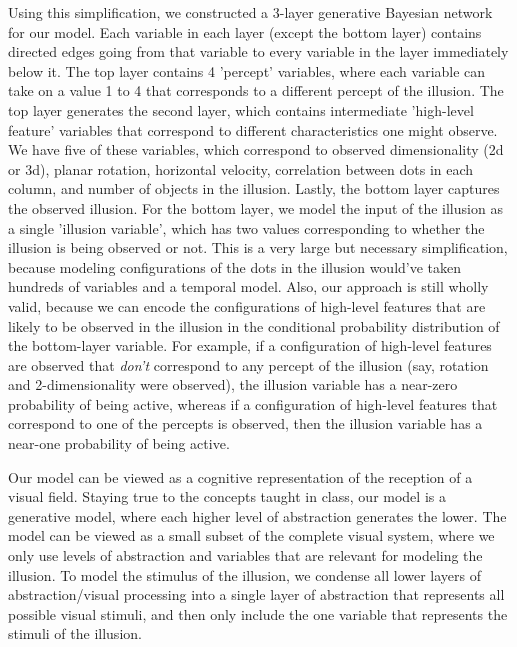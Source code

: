 \documentclass{article} %
\begin{document}
Using this simplification, we constructed a 3-layer generative Bayesian network for our model. Each variable in each layer (except the bottom layer) contains directed edges going from that variable to every variable in the layer immediately below it. The top layer contains 4 'percept' variables, where each variable can take on a value 1 to 4 that corresponds to a different percept of the illusion. The top layer generates the second layer, which contains intermediate 'high-level feature' variables that correspond to different characteristics one might observe. We have five of these variables, which correspond to observed dimensionality (2d or 3d), planar rotation, horizontal velocity, correlation between dots in each column, and number of objects in the illusion. Lastly, the bottom layer captures the observed illusion. For the bottom layer, we model the input of the illusion as a single 'illusion variable', which has two values corresponding to whether the illusion is being observed or not. This is a very large but necessary simplification, because modeling configurations of the dots in the illusion would've taken hundreds of variables and a temporal model. Also, our approach is still wholly valid, because we can encode the configurations of high-level features that are likely to be observed in the illusion in the conditional probability distribution of the bottom-layer variable. For example, if a configuration of high-level features are observed that \emph{don't} correspond to any percept of the illusion (say, rotation and 2-dimensionality were observed), the illusion variable has a near-zero probability of being active, whereas if a configuration of high-level features that correspond to one of the percepts is observed, then the illusion variable has a near-one probability of being active.

Our model can be viewed as a cognitive representation of the reception of a visual field. Staying true to the concepts taught in class, our model is a generative model, where each higher level of abstraction generates the lower. The model can be viewed as a small subset of the complete visual system, where we only use levels of abstraction and variables that are relevant for modeling the illusion. To model the stimulus of the illusion, we condense all lower layers of abstraction/visual processing into a single layer of abstraction that represents all possible visual stimuli, and then only include the one variable that represents the stimuli of the illusion. 
\end{document}
